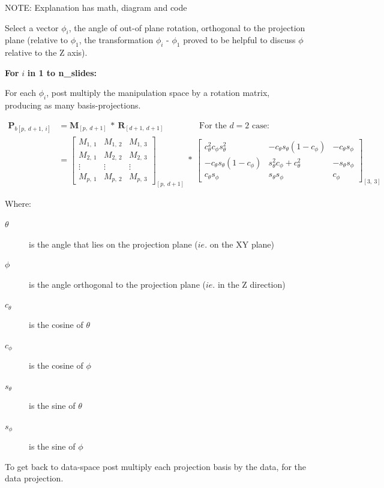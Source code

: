\documentclass{monashthesis}
\begin{document}
NOTE: Explanation has math, diagram and code

Select a vector \(\phi_i\), the angle of out-of plane rotation, orthogonal to the projection plane (relative to \(\phi_1\), the transformation \(\phi_i\) - \(\phi_1\) proved to be helpful to discuss \(\phi\) relative to the Z axis).

\textbf{For } \(i\) \textbf{in 1 to n\_slides:}

For each \(\phi_i\), post multiply the manipulation space by a rotation matrix, producing as many basis-projections.

\begin{align*}
  \textbf{P}_{b[p,~d+1,~i]}
  &= \textbf{M}_{[p,~d+1]} ~*~ \textbf{R}_{[d+1,~d+1]} 
    ~~~~~~~~~~~~~~~~~~~\text{For the $d=2$ case:} \\
  &= \begin{bmatrix}
    M_{1,~1} & M_{1,~2} & M_{1,~3} \\
    M_{2,~1} & M_{2,~2} & M_{2,~3} \\
    \vdots   & \vdots   & \vdots   \\
    M_{p,~1} & M_{p,~2} & M_{p,~3}
  \end{bmatrix}_{[p,~d+1]}
    ~*~
  \begin{bmatrix}
    c_\theta^2 c_\phi s_\theta^2 &
    -c_\theta s_\theta (1 - c_\phi) &
    -c_\theta s_\phi \\
    -c_\theta s_\theta (1 - c_\phi) &
    s_\theta^2 c_\phi + c_\theta^2 &
    -s_\theta s_\phi \\
    c_\theta s_\phi &
    s_\theta s_\phi &
    c_\phi
  \end{bmatrix}_{[3,~3]}
\end{align*}

Where:

\begin{description}
  \item[$\theta$] is the angle that lies on the projection plane ($ie.$ on the XY plane)
  \item[$\phi$] is the angle orthogonal to the projection plane ($ie.$ in the Z direction)
  \item[$c_\theta$] is the cosine of $\theta$
  \item[$c_\phi$]   is the cosine of $\phi$
  \item[$s_\theta$] is the sine of   $\theta$
  \item[$s_\phi$]   is the sine of   $\phi$
\end{description}

To get back to data-space post multiply each projection basis by the data, for the data projection.
\end{document}
